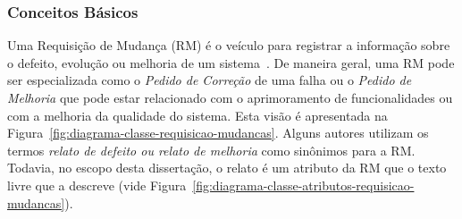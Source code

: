 \subsubsection{Conceitos Básicos}
\label{subsec:tipos_de_requisicoes_mudanca}






Uma Requisição de Mudança (RM) é o veículo para registrar a informação sobre o
defeito, evolução ou melhoria de um sistema~\cite{tripathy2014software}. De
maneira geral, uma RM pode ser especializada como o \textit{Pedido de Correção}
de uma falha ou o \textit{Pedido de Melhoria} que pode estar relacionado com o
aprimoramento de funcionalidades ou com a melhoria da qualidade do sistema. Esta
visão é apresentada na Figura~\ref{fig:diagrama-classe-requisicao-mudancas}.
Alguns autores utilizam os termos \textit{relato de defeito ou relato de
    melhoria} como sinônimos para a RM\@. Todavia, no escopo desta dissertação, o
relato é um atributo da RM que o texto livre que a descreve (vide
Figura~\ref{fig:diagrama-classe-atributos-requisicao-mudancas}).

